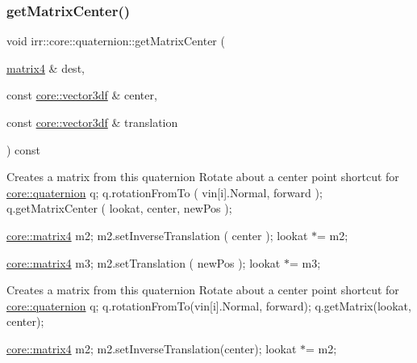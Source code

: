 \subsubsection{\texorpdfstring{get\+Matrix\+Center()}{getMatrixCenter()}\hspace{0.1cm}{\footnotesize\ttfamily [1/2]}}
{\footnotesize\ttfamily void irr\+::core\+::quaternion\+::get\+Matrix\+Center (\begin{DoxyParamCaption}\item[{\hyperlink{namespaceirr_1_1core_a4c9d4e29899535971052810954a14431}{matrix4} \&}]{dest,  }\item[{const \hyperlink{namespaceirr_1_1core_ae6e2b2a6c552833ebbd5b7463d03586b}{core\+::vector3df} \&}]{center,  }\item[{const \hyperlink{namespaceirr_1_1core_ae6e2b2a6c552833ebbd5b7463d03586b}{core\+::vector3df} \&}]{translation }\end{DoxyParamCaption}) const\hspace{0.3cm}{\ttfamily [inline]}}

Creates a matrix from this quaternion Rotate about a center point shortcut for \hyperlink{classirr_1_1core_1_1quaternion}{core\+::quaternion} q; q.\+rotation\+From\+To ( vin\mbox{[}i\mbox{]}.Normal, forward ); q.\+get\+Matrix\+Center ( lookat, center, new\+Pos );

\hyperlink{namespaceirr_1_1core_a4c9d4e29899535971052810954a14431}{core\+::matrix4} m2; m2.\+set\+Inverse\+Translation ( center ); lookat $\ast$= m2;

\hyperlink{namespaceirr_1_1core_a4c9d4e29899535971052810954a14431}{core\+::matrix4} m3; m2.\+set\+Translation ( new\+Pos ); lookat $\ast$= m3;

Creates a matrix from this quaternion Rotate about a center point shortcut for \hyperlink{classirr_1_1core_1_1quaternion}{core\+::quaternion} q; q.\+rotation\+From\+To(vin\mbox{[}i\mbox{]}.Normal, forward); q.\+get\+Matrix(lookat, center);

\hyperlink{namespaceirr_1_1core_a4c9d4e29899535971052810954a14431}{core\+::matrix4} m2; m2.\+set\+Inverse\+Translation(center); lookat $\ast$= m2; \mbox{\label{classirr_1_1core_1_1quaternion_ab0ed43e2e137b42128a80f71f03dac44}} 
